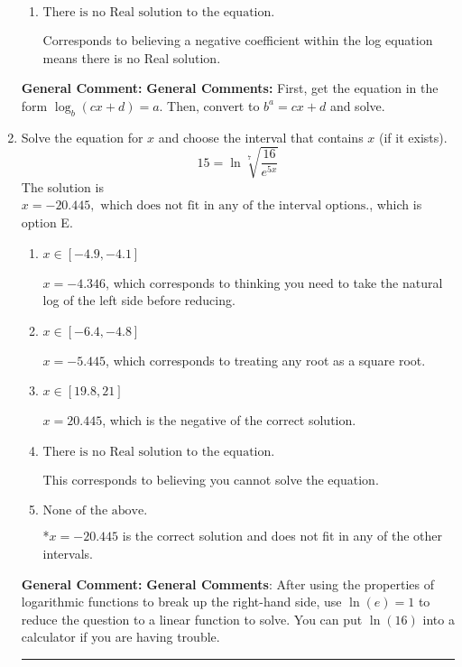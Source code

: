\documentclass{extbook}[14pt]
\newcommand{\litem}[1]{\item #1

\rule{\textwidth}{0.4pt}}
\begin{document}
\begin{enumerate}
{\begin{enumerate}[label=\Alph*.]
$x = 6.500$, which corresponds to reversing the base and exponent when converting and reversing the value with $x$.
\item \( \text{There is no Real solution to the equation.} \)

Corresponds to believing a negative coefficient within the log equation means there is no Real solution.
\end{enumerate}

\textbf{General Comment:} \textbf{General Comments:} First, get the equation in the form $\log_b{(cx+d)} = a$. Then, convert to $b^a = cx+d$ and solve.
}
\litem{
 Solve the equation for $x$ and choose the interval that contains $x$ (if it exists).
\[  15 = \ln{\sqrt[7]{\frac{16}{e^{5x}}}} \]
The solution is \( x = -20.445, \text{ which does not fit in any of the interval options.} \), which is option E.\begin{enumerate}[label=\Alph*.]
\item \( x \in [-4.9, -4.1] \)

$x = -4.346$, which corresponds to thinking you need to take the natural log of the left side before reducing.
\item \( x \in [-6.4, -4.8] \)

$x = -5.445$, which corresponds to treating any root as a square root.
\item \( x \in [19.8, 21] \)

$x = 20.445$, which is the negative of the correct solution.
\item \( \text{There is no Real solution to the equation.} \)

This corresponds to believing you cannot solve the equation.
\item \( \text{None of the above.} \)

*$x = -20.445$ is the correct solution and does not fit in any of the other intervals.
\end{enumerate}

\textbf{General Comment:} \textbf{General Comments}: After using the properties of logarithmic functions to break up the right-hand side, use $\ln(e) = 1$ to reduce the question to a linear function to solve. You can put $\ln(16)$ into a calculator if you are having trouble.
}
\end{enumerate}
\end{document}
